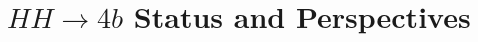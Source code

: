 \newcommand*{\ifb}{fb$^{-1}$ }
\newcommand*{\smhh}{SM $HH$ }

\section{$HH \to 4b$ Status and Perspectives}
\label{sec:HH4b}



        

